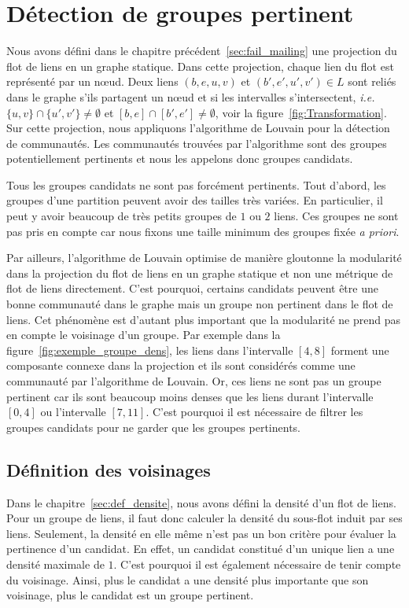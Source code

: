 \section{Détection de groupes pertinent}
\label{sec:groupe_dense_method}

Nous avons défini dans le chapitre précédent~\ref{sec:fail_mailing} une projection du flot de liens en un graphe statique.
Dans cette projection, chaque lien du flot est représenté par un n\oe ud.
Deux liens $(b,e,u,v)$ et $(b',e',u',v') \in L$ sont reliés dans le graphe s'ils partagent un n\oe ud et si les intervalles s'intersectent, \emph{i.e.} $\{u,v\} \cap \{u',v'\} \neq \emptyset$ et $[b,e]\cap[b',e'] \neq \emptyset$, voir la figure~\ref{fig:Transformation}.
Sur cette projection, nous appliquons l'algorithme de Louvain pour la détection de communautés.
Les communautés trouvées par l'algorithme sont des groupes potentiellement pertinents et nous les appelons donc groupes candidats.

Tous les groupes candidats ne sont pas forcément pertinents.
Tout d'abord, les groupes d'une partition peuvent avoir des tailles très variées.
En particulier, il peut y avoir beaucoup de très petits groupes de $1$ ou $2$ liens.
Ces groupes ne sont pas pris en compte car nous fixons une taille minimum des groupes fixée \emph{a priori}.

Par ailleurs, l'algorithme de Louvain optimise de manière gloutonne la modularité dans la projection du flot de liens en un graphe statique et non une métrique de flot de liens directement.
C'est pourquoi, certains candidats peuvent être une bonne communauté dans le graphe mais un groupe non pertinent dans le flot de liens.
Cet phénomène est d'autant plus important que la modularité ne prend pas en compte le voisinage d'un groupe.
Par exemple dans la figure~\ref{fig:exemple_groupe_dens}, les liens dans l'intervalle $[4,8]$ forment une composante connexe dans la projection et ils sont considérés comme une communauté par l'algorithme de Louvain.
Or, ces liens ne sont pas un groupe pertinent car ils sont beaucoup moins denses que les liens durant l'intervalle $[0,4]$ ou l'intervalle $[7,11]$.
C'est pourquoi il est nécessaire de filtrer les groupes candidats pour ne garder que les groupes pertinents.




\subsection{Définition des voisinages}
Dans le chapitre~\ref{sec:def_densite}, nous avons défini la densité d'un flot de liens.
Pour un groupe de liens, il faut donc calculer la densité du sous-flot induit par ses liens.
Seulement, la densité en elle même n'est pas un bon critère pour évaluer la pertinence d'un candidat.
En effet, un candidat constitué d'un unique lien a une densité maximale de $1$.
C'est pourquoi il est également nécessaire de tenir compte du voisinage.
Ainsi, plus le candidat a une densité plus importante que son voisinage, plus le candidat est un groupe pertinent.


